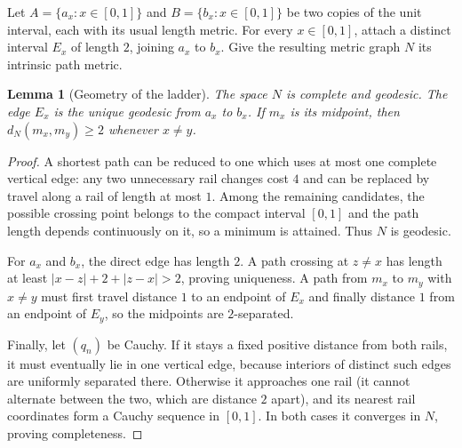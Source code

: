\documentclass[11pt]{article}
\newtheorem{lemma}[theorem]{Lemma}
\begin{document}
Let $A=\{a_x:x\in[0,1]\}$ and $B=\{b_x:x\in[0,1]\}$ be two copies of the
unit interval, each with its usual length metric.  For every $x\in[0,1]$,
attach a distinct interval $E_x$ of length $2$, joining $a_x$ to $b_x$.
Give the resulting metric graph $N$ its intrinsic path metric.

\begin{center}
\end{center}

\begin{lemma}[Geometry of the ladder]
\label{lem:ladder}
The space $N$ is complete and geodesic.  The edge $E_x$ is the unique
geodesic from $a_x$ to $b_x$.  If $m_x$ is its midpoint, then
$d_N(m_x,m_y)\geq2$ whenever $x\neq y$.
\end{lemma}

\begin{proof}
A shortest path can be reduced to one which uses at most one complete
vertical edge: any two unnecessary rail changes cost $4$ and can be replaced
by travel along a rail of length at most $1$.  Among the remaining candidates,
the possible crossing point belongs to the compact interval $[0,1]$ and the
path length depends continuously on it, so a minimum is attained.  Thus $N$
is geodesic.

For $a_x$ and $b_x$, the direct edge has length $2$.  A path crossing at
$z\neq x$ has length at least
$|x-z|+2+|z-x|>2$, proving uniqueness.  A path from $m_x$ to $m_y$ with
$x\neq y$ must first travel distance $1$ to an endpoint of $E_x$ and finally
distance $1$ from an endpoint of $E_y$, so the midpoints are $2$-separated.

Finally, let $(q_n)$ be Cauchy.  If it stays a fixed positive distance from
both rails, it must eventually lie in one vertical edge, because interiors of
distinct such edges are uniformly separated there.  Otherwise it approaches
one rail (it cannot alternate between the two, which are distance $2$ apart),
and its nearest rail coordinates form a Cauchy sequence in $[0,1]$.  In both
cases it converges in $N$, proving completeness.
\end{proof}
\end{document}
